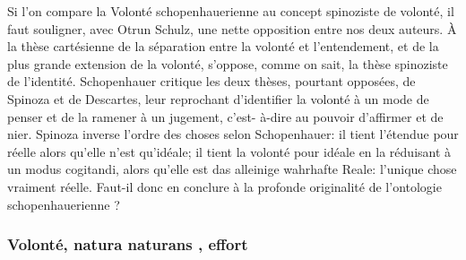 Si l’on compare la Volonté schopenhauerienne au concept spinoziste de volonté, il faut souligner, avec
Otrun Schulz, une nette opposition entre nos deux auteurs. À la thèse cartésienne de la séparation entre la
volonté et l’entendement, et de la plus grande extension de la volonté, s’oppose, comme on sait, la thèse
spinoziste de l’identité. Schopenhauer critique les deux thèses, pourtant opposées, de Spinoza et de
Descartes, leur reprochant d’identifier la volonté à un mode de penser et de la ramener à un jugement, c’est-
à-dire au pouvoir d’affirmer et de nier. Spinoza inverse l’ordre des choses selon Schopenhauer: il tient
l’étendue pour réelle alors qu’elle n’est qu’idéale; il tient la volonté pour idéale en la réduisant à un modus
cogitandi, alors qu’elle est das alleinige wahrhafte Reale: l’unique chose vraiment réelle.
Faut-il donc en conclure à la profonde originalité de l’ontologie schopenhauerienne ?

\subsubsection{Volonté, natura naturans , effort}

